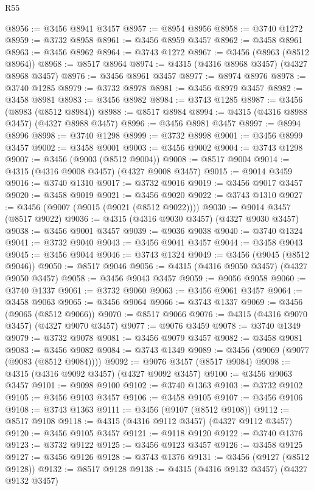 \begin{lexlean}{R55}
\begin{coremodule}
@8956 := @3456 @8941 @3457
@8957 := @8954 @8956
@8958 := @3740 @1272
@8959 := @3732 @8958
@8961 := @3456 @8959 @3457
@8962 := @3458 @8961
@8963 := @3456 @8962
@8964 := @3743 @1272
@8967 := @3456 (@8963 (@8512 @8964))
@8968 := @8517 @8964
@8974 := @4315 (@4316 @8968 @3457) (@4327 @8968 @3457)
@8976 := @3456 @8961 @3457
@8977 := @8974 @8976
@8978 := @3740 @1285
@8979 := @3732 @8978
@8981 := @3456 @8979 @3457
@8982 := @3458 @8981
@8983 := @3456 @8982
@8984 := @3743 @1285
@8987 := @3456 (@8983 (@8512 @8984))
@8988 := @8517 @8984
@8994 := @4315 (@4316 @8988 @3457) (@4327 @8988 @3457)
@8996 := @3456 @8981 @3457
@8997 := @8994 @8996
@8998 := @3740 @1298
@8999 := @3732 @8998
@9001 := @3456 @8999 @3457
@9002 := @3458 @9001
@9003 := @3456 @9002
@9004 := @3743 @1298
@9007 := @3456 (@9003 (@8512 @9004))
@9008 := @8517 @9004
@9014 := @4315 (@4316 @9008 @3457) (@4327 @9008 @3457)
@9015 := @9014 @3459
@9016 := @3740 @1310
@9017 := @3732 @9016
@9019 := @3456 @9017 @3457
@9020 := @3458 @9019
@9021 := @3456 @9020
@9022 := @3743 @1310
@9027 := @3456 (@9007 (@9015 (@9021 (@8512 @9022))))
@9030 := @9014 @3457 (@8517 @9022)
@9036 := @4315 (@4316 @9030 @3457) (@4327 @9030 @3457)
@9038 := @3456 @9001 @3457
@9039 := @9036 @9038
@9040 := @3740 @1324
@9041 := @3732 @9040
@9043 := @3456 @9041 @3457
@9044 := @3458 @9043
@9045 := @3456 @9044
@9046 := @3743 @1324
@9049 := @3456 (@9045 (@8512 @9046))
@9050 := @8517 @9046
@9056 := @4315 (@4316 @9050 @3457) (@4327 @9050 @3457)
@9058 := @3456 @9043 @3457
@9059 := @9056 @9058
@9060 := @3740 @1337
@9061 := @3732 @9060
@9063 := @3456 @9061 @3457
@9064 := @3458 @9063
@9065 := @3456 @9064
@9066 := @3743 @1337
@9069 := @3456 (@9065 (@8512 @9066))
@9070 := @8517 @9066
@9076 := @4315 (@4316 @9070 @3457) (@4327 @9070 @3457)
@9077 := @9076 @3459
@9078 := @3740 @1349
@9079 := @3732 @9078
@9081 := @3456 @9079 @3457
@9082 := @3458 @9081
@9083 := @3456 @9082
@9084 := @3743 @1349
@9089 := @3456 (@9069 (@9077 (@9083 (@8512 @9084))))
@9092 := @9076 @3457 (@8517 @9084)
@9098 := @4315 (@4316 @9092 @3457) (@4327 @9092 @3457)
@9100 := @3456 @9063 @3457
@9101 := @9098 @9100
@9102 := @3740 @1363
@9103 := @3732 @9102
@9105 := @3456 @9103 @3457
@9106 := @3458 @9105
@9107 := @3456 @9106
@9108 := @3743 @1363
@9111 := @3456 (@9107 (@8512 @9108))
@9112 := @8517 @9108
@9118 := @4315 (@4316 @9112 @3457) (@4327 @9112 @3457)
@9120 := @3456 @9105 @3457
@9121 := @9118 @9120
@9122 := @3740 @1376
@9123 := @3732 @9122
@9125 := @3456 @9123 @3457
@9126 := @3458 @9125
@9127 := @3456 @9126
@9128 := @3743 @1376
@9131 := @3456 (@9127 (@8512 @9128))
@9132 := @8517 @9128
@9138 := @4315 (@4316 @9132 @3457) (@4327 @9132 @3457)

\end{coremodule}
\end{lexlean}
